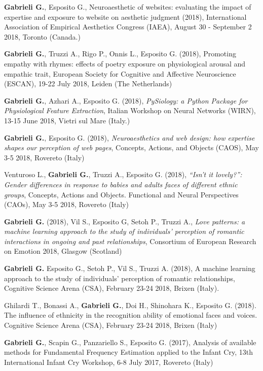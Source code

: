 \documentclass[a4paper]{deedy-resume} %
\begin{document}
\begin{minipage}[t]{0.63\textwidth}
	\sectionspace %
	\begin{tightitemize}
		\item \textbf{Gabrieli G.}, Esposito G., Neuroaesthetic of websites: evaluating the impact of expertise and exposure to website on aesthetic judgment (2018), International Association of Empirical Aesthetics Congress (IAEA), August 30 - September 2 2018, Toronto (Canada.)
		\item \textbf{Gabrieli G.}, Truzzi A., Rigo P., Onnis L., Esposito G. (2018), Promoting empathy with rhymes: effects of poetry exposure on physiological arousal and empathic trait, European Society for Cognitive and Affective Neuroscience (ESCAN), 19-22 July 2018, Leiden (The Netherlands)
		\item \textbf{Gabrieli G.}, Azhari A., Esposito G. (2018), \textit{PySiology: a Python Package for Physiological Feature Extraction}, Italian Workshop on Neural Networks (WIRN), 13-15 June 2018, Vietri sul Mare (Italy.)
		\item \textbf{Gabrieli G.}, Esposito G. (2018), \textit{Neuroaesthetics and web design: how expertise shapes our perception of web pages}, Concepts, Actions, and Objects (CAOS), May  3-5 2018, Rovereto (Italy)
		\item Venturoso L., \textbf{Gabrieli G.}, Truzzi A., Esposito G. (2018), \textit{“Isn’t it lovely?”: Gender differences in response to babies and adults faces of different ethnic groups}, Concepts, Actions and Objects. Functional and Neural Perspectives (CAOs), May 3-5 2018, Rovereto (Italy)
		\item \textbf{Gabrieli G.} (2018), Vil S., Esposito G, Setoh P., Truzzi A., \textit{Love patterns: a machine learning approach to the study of individuals’ perception of romantic interactions in ongoing and past relationships}, Consortium of European Research on Emotion 2018, Glasgow (Scotland)	
	    \item \textbf{Gabrieli G.} Esposito G., Setoh P., Vil S., Truzzi A. (2018),	A machine learning approach to the study of individuals’ perception of romantic relationships, Cognitive Science Arena (CSA), February 23-24 2018, Brixen (Italy).
		\item Ghilardi T., Bonassi A., \textbf{Gabrieli G.}, Doi H., Shinohara K., Esposito G. (2018). The influence of ethnicity in the recognition ability of emotional faces and voices. Cognitive Science Arena (CSA), February 23-24 2018, Brixen (Italy)
		\item \textbf{Gabrieli G.}, Scapin G., Panzariello S., Esposito G. (2017), Analysis of available methods for Fundamental Frequency Estimation applied to the Infant Cry, 13th International Infant Cry Workshop, 6-8 July 2017, Rovereto (Italy)

\end{tightitemize}
\end{minipage}
\end{document}
